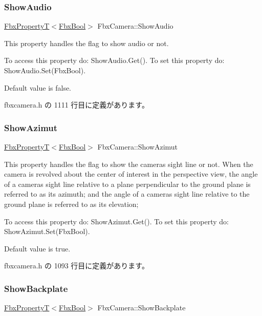 \subsubsection{\texorpdfstring{Show\+Audio}{ShowAudio}}
{\footnotesize\ttfamily \hyperlink{class_fbx_property_t}{Fbx\+PropertyT}$<$\hyperlink{fbxtypes_8h_a92e0562b2fe33e76a242f498b362262e}{Fbx\+Bool}$>$ Fbx\+Camera\+::\+Show\+Audio}

This property handles the flag to show audio or not.

To access this property do\+: Show\+Audio.\+Get(). To set this property do\+: Show\+Audio.\+Set(\+Fbx\+Bool).

Default value is false. 

 fbxcamera.\+h の 1111 行目に定義があります。

\mbox{\label{class_fbx_camera_a7f2e404049521f2b8ed8793bb231d9a0}} 
\subsubsection{\texorpdfstring{Show\+Azimut}{ShowAzimut}}
{\footnotesize\ttfamily \hyperlink{class_fbx_property_t}{Fbx\+PropertyT}$<$\hyperlink{fbxtypes_8h_a92e0562b2fe33e76a242f498b362262e}{Fbx\+Bool}$>$ Fbx\+Camera\+::\+Show\+Azimut}

This property handles the flag to show the camera\textquotesingle{}s sight line or not. When the camera is revolved about the center of interest in the perspective view, the angle of a camera\textquotesingle{}s sight line relative to a plane perpendicular to the ground plane is referred to as its azimuth; and the angle of a camera\textquotesingle{}s sight line relative to the ground plane is referred to as its elevation;

To access this property do\+: Show\+Azimut.\+Get(). To set this property do\+: Show\+Azimut.\+Set(\+Fbx\+Bool).

Default value is true. 

 fbxcamera.\+h の 1093 行目に定義があります。

\mbox{\label{class_fbx_camera_a3e824d5e68ecd7ff571c3d783b3a82b3}} 
\subsubsection{\texorpdfstring{Show\+Backplate}{ShowBackplate}}
{\footnotesize\ttfamily \hyperlink{class_fbx_property_t}{Fbx\+PropertyT}$<$\hyperlink{fbxtypes_8h_a92e0562b2fe33e76a242f498b362262e}{Fbx\+Bool}$>$ Fbx\+Camera\+::\+Show\+Backplate}

